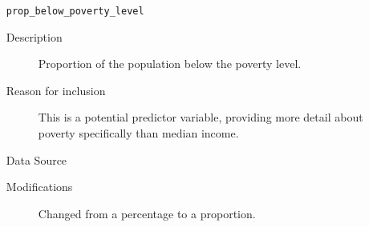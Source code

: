 \documentclass{article}
\begin{document}
\begin{itemize}[label={}, align=left]
\begin{description}
          \end{description}
    \item[\texttt{prop\_below\_poverty\_level}] \
          \begin{description}
              \item[Description] Proportion of the population below the poverty level.
              \item[Reason for inclusion] This is a potential predictor
                    variable, providing more detail about poverty specifically
                    than median income.
              \item[Data Source] \cite{acs_poverty_data}
              \item[Modifications] Changed from a percentage to a proportion.
          \end{description}
\end{itemize}
\printbibliography
\end{document}
